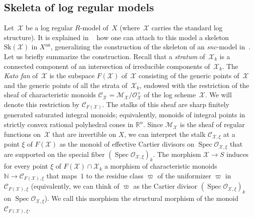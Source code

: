 \documentclass[JEP,XML,SOM,Unicode,NoFloatCountersInSection]{cedram}
\let\mathcal\mathscr
\theoremstyle{definition}
\numberwithin{equation}{subsection}
\newcommand{\N}{\ensuremath{\mathbb{N}}}
\newcommand{\R}{\ensuremath{\mathbb{R}}}
\newcommand{\cX}{\ensuremath{\mathscr{X}}}
\newcommand{\snc}{\textit{snc}}
\newcommand{\an}{\mathrm{an}}
\newcommand{\Sk}{\mathrm{Sk}}
\DeclareMathOperator{\Spec}{Spec}
\let\unif\varpi
\begin{document}
\subsection{Skeleta of log regular models}\label{ss:logskeleta}
Let~$\cX$ be a log regular $R$\nobreakdash-model of~$X$ (where~$\cX$ carries the standard log structure). It is explained in ~\cite[\S3]{BrMa} how one can attach to this model a skeleton $\Sk(\cX)$ in $X^{\an}$, generalizing the construction of the skeleton of an \snc-model in~\cite[\S3]{MuNi}. Let us briefly summarize the construction.
Recall that a {\em stratum} of~$\cX_k$ is a connected component of an intersection of irreducible components of~$\cX_k$.
The {\em Kato fan} of~$\cX$
is the subspace $F(\cX)$ of~$\cX$ consisting of the generic points of~$\cX$ and the generic points of all the strata of~$\cX_k$, endowed with the restriction of the sheaf of characteristic monoids $\mathcal{C}_{\cX}=\mathcal{M}_{\cX}/\mathcal{O}^{\times}_{\cX}$ of the log scheme~$\cX$. We will denote this restriction by $\mathcal{C}_{F(\cX)}$. The stalks of this sheaf are
sharp finitely generated saturated integral monoids; equivalently, monoids of integral points in strictly convex rational polyhedral cones in $\R^n$.
Since $\mathcal{M}_{\cX}$ is the sheaf of regular functions on~$\cX$ that are invertible on $X$,
we can interpret the stalk $\mathcal{C}_{\cX,\xi}$ at a point $\xi$ of $F(\cX)$ as the monoid of effective Cartier divisors on $\Spec \mathcal{O}_{\cX,\xi}$ that are supported on the special fiber $(\Spec \mathcal{O}_{\cX,\xi})_k$.
The morphism $\cX\to S$ induces for every point $\xi$ of $F(\cX)\cap \cX_k$ a morphism of characteristic monoids $\N\to \mathcal{C}_{F(\cX),\xi}$ that maps~$1$ to the residue class $\overline{\unif}$ of the uniformizer $\unif$ in $\mathcal{C}_{F(\cX),\xi}$ (equivalently, we can think of $\overline{\unif}$ as the Cartier divisor $(\Spec \mathcal{O}_{\cX,\xi})_k$ on $\Spec \mathcal{O}_{\cX,\xi}$). We call this morphism the structural morphism of the monoid $\mathcal{C}_{F(\cX),\xi}$.
\end{document}
